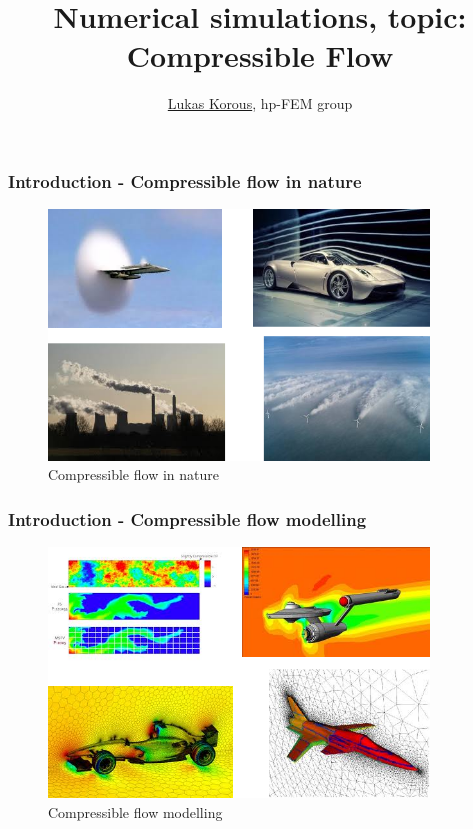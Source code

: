 \documentclass{beamer}
\title{Numerical simulations, topic: Compressible Flow}
\author{\underline{Lukas Korous}, hp-FEM group}
\institute[Pilsen]{\large{\underline{University of West Bohemia, Pilsen}}\normalsize, University of Nevada, Reno}
\begin{document}


\begin{frame}
\large
\titlepage
\end{frame}

\begin{frame}
\frametitle{Introduction - Compressible flow in nature}
\begin{figure}[!ht]
\vspace{-1mm}
\begin{center}
\includegraphics[width=0.9\textwidth]{hermes-motivationIn.png}
\caption{Compressible flow in nature}
\end{center}
\noindent
\vspace{-4mm}
\end{figure}
\end{frame}

\begin{frame}
\frametitle{Introduction - Compressible flow modelling}
\begin{figure}[!ht]
\vspace{-1mm}
\begin{center}
\includegraphics[width=0.9\textwidth]{hermes-motivationOut.png}
\caption{Compressible flow modelling}
\end{center}
\noindent
\vspace{-4mm}
\end{figure}
\end{frame}
\end{document}

